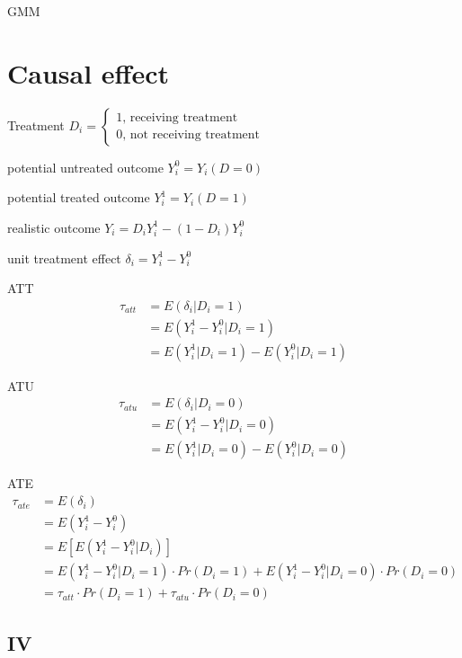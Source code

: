 \documentclass{article}
\begin{document}
GMM


\section{Causal effect}

Treatment
$D_i=
\begin{cases}
  1 \text{, receiving treatment}\\
  0 \text{, not receiving treatment}
\end{cases}$

potential untreated outcome
$Y_{i}^{0}=Y_{i}(D=0)$

potential treated outcome
$Y_{i}^{1}=Y_{i}(D=1)$

realistic outcome
$Y_{i}=D_{i}Y_{i}^{1}-(1-D_{i})Y_{i}^{0}$

unit treatment effect
$\delta_{i}=Y_{i}^{1}-Y_{i}^{0}$

ATT
\begin{equation}
\begin{split}
\tau_{att}&=E(\delta_{i}|D_{i}=1)
\\&=E(Y^{1}_{i}-Y^{0}_{i}|D_{i}=1)
\\&=E(Y^{1}_{i}|D_{i}=1)-E(Y^{0}_{i}|D_{i}=1)
\end{split}
\end{equation}


ATU
\begin{equation}
\begin{split}
\tau_{atu}&=E(\delta_{i}|D_{i}=0)
\\&=E(Y^{1}_{i}-Y^{0}_{i}|D_{i}=0)
\\&=E(Y^{1}_{i}|D_{i}=0)-E(Y^{0}_{i}|D_{i}=0)
\end{split}
\end{equation}

ATE
\begin{equation}
\begin{split}
\tau_{ate}&=E(\delta_{i})
\\&=E(Y^{1}_{i}-Y^{0}_{i})
\\&=E[E(Y_{i}^{1}-Y_{i}^{0}|D_{i})]
\\&=E(Y_{i}^{1}-Y_{i}^{0}|D_{i}=1)\cdot Pr(D_{i}=1)+E(Y_{i}^{1}-Y_{i}^{0}|D_{i}=0)\cdot Pr(D_{i}=0)
\\&=\tau_{att}\cdot Pr(D_{i}=1)+\tau_{atu} \cdot Pr(D_{i}=0)
\end{split}
\end{equation}

\subsection{IV}
\end{document}
